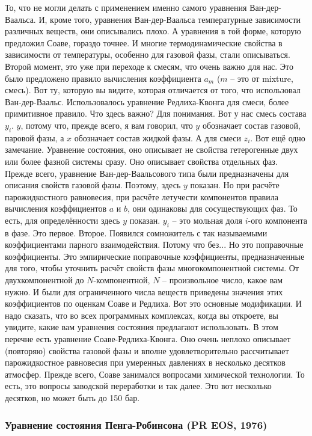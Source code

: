 \documentclass[main.tex]{subfiles}
\begin{document}
То, что не могли делать с применением именно самого уравнения Ван-дер-Ваальса.
И, кроме того, уравнения Ван-дер-Ваальса температурные зависимости различных веществ, они описывались плохо.
А уравнения в той форме, которую предложил Соаве, гораздо точнее.
И многие термодинамические свойства в зависимости от температуры, особенно для газовой фазы, стали описываться.
Второй момент, это уже при переходе к смесям, что очень важно для нас.
Это было предложено правило вычисления коэффициента $a_m$ ($m$ -- это от mixture, смесь).
Вот ту, которую вы видите, которая отличается от того, что использовал Ван-дер-Ваальс.
Использовалось уравнение Редлиха-Квонга для смеси, более примитивное правило.
Что здесь важно?
Для понимания.
Вот у нас смесь состава $y_i$.
$y$, потому что, прежде всего, я вам говорил, что $y$ обозначает состав газовой, паровой фазы, а $x$ обозначает состав жидкой фазы.
А для смеси $z_i$.
Вот ещё одно замечание.
Уравнение состояния, оно описывает не свойства гетерогенные двух или более фазной системы сразу.
Оно описывает свойства отдельных фаз.
Прежде всего, уравнение Ван-дер-Ваальсового типа были предназначены для описания свойств газовой фазы.
Поэтому, здесь $y$ показан.
Но при расчёте парожидкостного равновесия, при расчёте летучести компонентов правила вычисления коэффициентов $a$ и $b$, они одинаковы для сосуществующих фаз.
То есть, для определённости здесь $y$ показан.
$y_i$ -- это мольная доля $i$-ого компонента в фазе.
Это первое.
Второе.
Появился сомножитель  с так называемыми коэффициентами парного взаимодействия.
Потому что без...
Но это поправочные коэффициенты.
Это эмпирические поправочные коэффициенты, предназначенные для того, чтобы уточнить расчёт свойств фазы многокомпонентной системы.
От двухкомпонентной до $N$-компонентной, $N$ -- произвольное число, какое вам нужно.
И были для ограниченного числа веществ приведены значения этих коэффициентов по оценкам Соаве и Редлиха.
Вот это основные модификации.
И надо сказать, что во всех программных комплексах, когда вы откроете, вы увидите, какие вам уравнения состояния предлагают использовать.
В этом перечне есть уравнение Соаве-Редлиха-Квонга.
Оно очень неплохо описывает (повторяю) свойства газовой фазы и вполне удовлетворительно рассчитывает парожидкостное равновесия при умеренных давлениях в несколько десятков атмосфер.
Прежде всего, Соаве занимался вопросами химической технологии.
То есть, это вопросы заводской переработки и так далее.
Это вот несколько десятков, но может быть до 150 бар.

\subsubsection{Уравнение состояния Пенга-Робинсона (PR EOS, 1976)}
\end{document}
